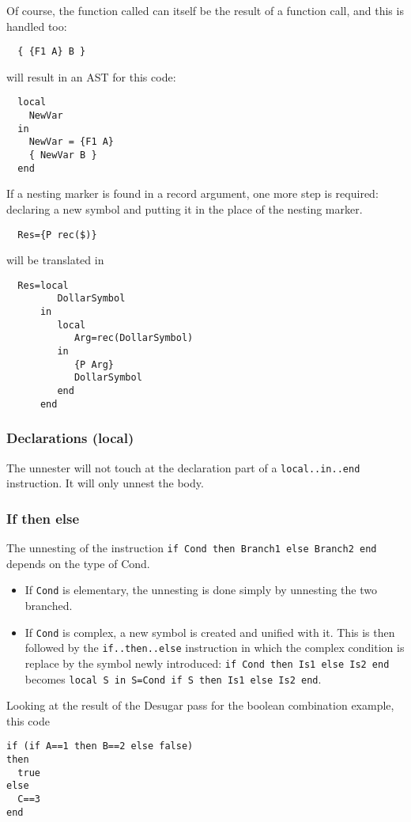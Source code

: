 \documentclass[a4paper]{memoir}
\begin{document}
Of course, the function called can itself be the result of a function call, and this is handled too:
\begin{lstlisting}
  { {F1 A} B }
\end{lstlisting}
will result in an AST for this code:
\begin{lstlisting}
  local
    NewVar
  in
    NewVar = {F1 A}
    { NewVar B }
  end
\end{lstlisting}

If a nesting marker is found in a record argument, one more step is required:
declaring a new symbol and putting it in the place of the nesting marker.
\begin{lstlisting}
  Res={P rec($)}
\end{lstlisting}
will be translated in
\begin{lstlisting}
  Res=local
         DollarSymbol
      in
         local 
            Arg=rec(DollarSymbol)
         in
            {P Arg}
            DollarSymbol
         end
      end
\end{lstlisting}

\subsubsection{Declarations (local)}
The unnester will not touch at the declaration part of a \lstinline!local..in..end! instruction. It will only unnest the body.
\subsubsection{If then else}
The unnesting of the instruction \lstinline!if Cond then Branch1 else Branch2 end! depends on the type of Cond. 
\begin{itemize}
  \item If \lstinline!Cond! is elementary, the unnesting is done simply by unnesting the two branched.
  \item If \lstinline!Cond! is complex, a new symbol is created and unified with it. This is then followed by the \lstinline!if..then..else! instruction in which the complex condition is replace by the symbol newly introduced:
    \lstinline!if Cond then Is1 else Is2 end! becomes \lstinline!local S in S=Cond if S then Is1 else Is2 end!.
\end{itemize}
Looking at the result of the Desugar pass for the boolean combination example, this code
\begin{lstlisting}
if (if A==1 then B==2 else false)
then
  true
else
  C==3
end
\end{lstlisting}
\end{document}
